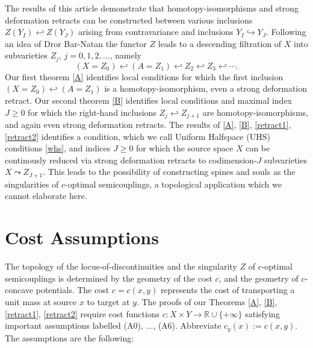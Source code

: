 \documentclass[12pt]{amsart}
\theoremstyle{definition}
\theoremstyle{remark}
\newcommand{\bR}{\mathbb{R}}
\begin{document}
The results of this article demonstrate that homotopy-isomorphisms and strong deformation retracts can be constructed between various inclusions $Z(Y_I) \hookleftarrow Z(Y_J)$ arising from contravariance and inclusions $Y_I\hookrightarrow Y_J$. Following an idea of Dror Bar-Natan \cite{Bar2002} the functor $Z$ leads to a descending filtration of $X$ into subvarieties $Z_j$, $j=0,1,2, \ldots$, namely \begin{equation}\label{filt}
(X=Z_0) \hookleftarrow (A=Z_1) \hookleftarrow Z_2 \hookleftarrow Z_3 \hookleftarrow \cdots .
\end{equation}
Our first theorem \ref{A} identifies local conditions for which the first inclusion $(X=Z_0) \hookleftarrow (A=Z_1)$ is a homotopy-isomorphism, even a strong deformation retract. Our second theorem \ref{B} identifies local conditions and maximal index $J\geq 0$ for which the right-hand inclusions $Z_j \hookleftarrow Z_{j+1}$ are homotopy-isomorphisms, and again even strong deformation retracts. The results of \ref{A}, \ref{B}, \ref{retract1}, \ref{retract2} identifies a condition, which we call Uniform Halfspace (UHS) conditions \ref{whs}, and indices $J\geq 0$ for which the source space $X$ can be continously reduced via strong deformation retracts to codimension-$J$ subvarieties $X \leadsto Z_{J+1} $. This leads to the possibility of constructing spines and souls as the singularities of $c$-optimal semicouplings, a topological application which we cannot elaborate here.



\section{Cost Assumptions}\label{costassump}

 The topology of the locus-of-discontinuities and the singularity $Z$ of $c$-optimal semicouplings is determined by the geometry of the cost $c$, and the geometry of $c$-concave potentials. The cost $c=c(x,y)$ represents the cost of transporting a unit mass at source $x$ to target at $y$. The proofs of our Theorems \ref{A}, \ref{B}, \ref{retract1}, \ref{retract2} require cost functions $c: X\times Y \to \bR \cup \{+\infty\}$ satisfying important assumptions labelled (A0), $\ldots$, (A6). Abbreviate $c_y(x):=c(x,y)$. The assumptions are the following:
\end{document}
